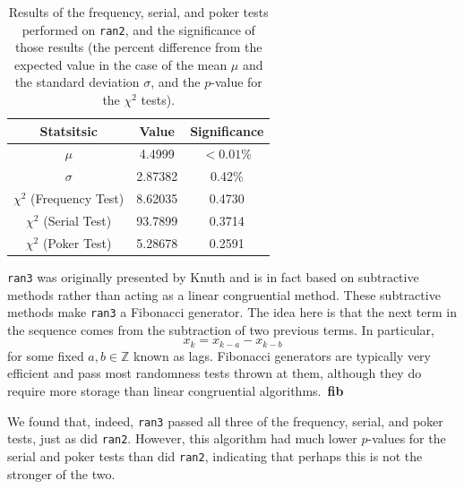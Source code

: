 \documentclass[12pt]{article}
\numberwithin{equation}{section}
\begin{document}
\begin{table}[ht]
\begin{center}
\begin{tabular}{c|c|c} \hline
Statsitsic & Value & Significance\\\hline
$\mu$ & 4.4999 & $<0.01\%$\\
$\sigma$ & 2.87382 & 0.42\%\\
$\chi^{2}$ (Frequency Test) & 8.62035 & 0.4730\\
$\chi^{2}$ (Serial Test) & 93.7899 & 0.3714\\
$\chi^{2}$ (Poker Test) & 5.28678 & 0.2591\\ \hline
\end{tabular}
\caption{Results of the frequency, serial, and poker tests performed on \texttt{ran2}, and the significance of those results (the percent difference from the expected value in the case of the mean $\mu$ and the standard deviation $\sigma$, and the $p$-value for the $\chi^{2}$ tests).}
\label{tab:ran2results}
\end{center}
\end{table}

\par \texttt{ran3} was originally presented by Knuth and is in fact based on subtractive methods rather than acting as a linear congruential method.  These subtractive methods make \texttt{ran3} a Fibonacci generator.  The idea here is that the next term in the sequence comes from the subtraction of two previous terms.  In particular,
\begin{equation}
\label{eq:fibgen}
x_{k}=x_{k-a}-x_{k-b}
\end{equation}
for some fixed $a,b\in\mathbb{Z}$ known as lags.  Fibonacci generators are typically very efficient and pass most randomness tests thrown at them, although they do require more storage than linear congruential algorithms.~\textbf{fib}
\par We found that, indeed, \texttt{ran3} passed all three of the frequency, serial, and poker tests, just as did \texttt{ran2}.  However, this algorithm had much lower $p$-values for the serial and poker tests than did \texttt{ran2}, indicating that perhaps this is not the stronger of the two.
\end{document}
